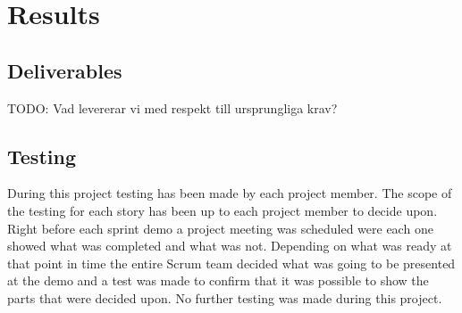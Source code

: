 


\section{Results}
\subsection{Deliverables}
TODO: Vad levererar vi med respekt till ursprungliga krav?
\subsection{Testing}
During this project testing has been made by each project member.
The scope of the testing for each story has been up to each project member to decide upon.
Right before each sprint demo a project meeting was scheduled were each one showed what was completed and what was not.
Depending on what was ready at that point in time the entire Scrum team decided what was going to be presented at the demo and a test was made to confirm that it was possible to show the parts that were decided upon.
No further testing was made during this project.
